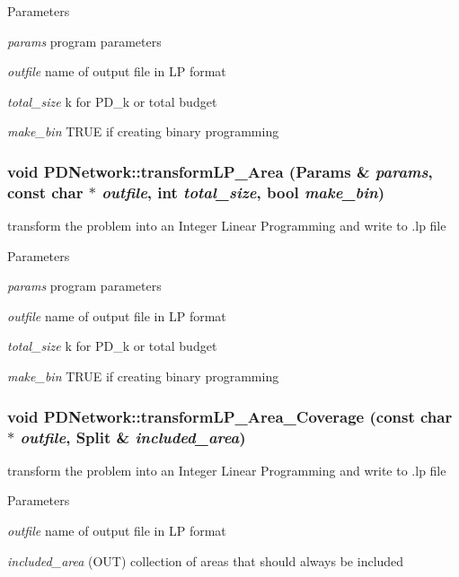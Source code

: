 \begin{DoxyParams}{Parameters}
\item[{\em params}]program parameters \item[{\em outfile}]name of output file in LP format \item[{\em total\_\-size}]k for PD\_\-k or total budget \item[{\em make\_\-bin}]TRUE if creating binary programming \end{DoxyParams}
\hypertarget{classPDNetwork_a0845b62f009a89057f045019dc547ff2}{
\subsubsection[{transformLP\_\-Area}]{\setlength{\rightskip}{0pt plus 5cm}void PDNetwork::transformLP\_\-Area ({\bf Params} \& {\em params}, \/  const char $\ast$ {\em outfile}, \/  int {\em total\_\-size}, \/  bool {\em make\_\-bin})}}
\label{classPDNetwork_a0845b62f009a89057f045019dc547ff2}
transform the problem into an Integer Linear Programming and write to .lp file 
\begin{DoxyParams}{Parameters}
\item[{\em params}]program parameters \item[{\em outfile}]name of output file in LP format \item[{\em total\_\-size}]k for PD\_\-k or total budget \item[{\em make\_\-bin}]TRUE if creating binary programming \end{DoxyParams}
\hypertarget{classPDNetwork_a02a5df18864c94bef7bbbfa0f5f7c80b}{
\subsubsection[{transformLP\_\-Area\_\-Coverage}]{\setlength{\rightskip}{0pt plus 5cm}void PDNetwork::transformLP\_\-Area\_\-Coverage (const char $\ast$ {\em outfile}, \/  {\bf Split} \& {\em included\_\-area})}}
\label{classPDNetwork_a02a5df18864c94bef7bbbfa0f5f7c80b}
transform the problem into an Integer Linear Programming and write to .lp file 
\begin{DoxyParams}{Parameters}
\item[{\em outfile}]name of output file in LP format \item[{\em included\_\-area}](OUT) collection of areas that should always be included \end{DoxyParams}
